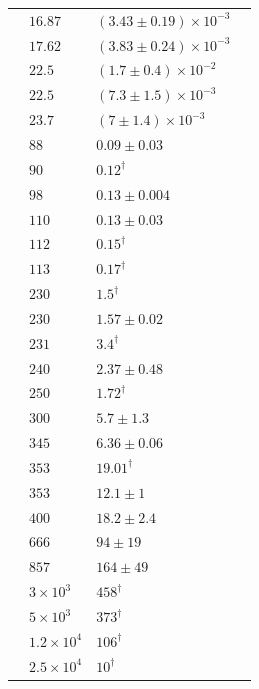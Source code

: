 \documentclass[9pt]{extarticle}   	%
\begin{document}
\begin{table}
\begin{center}
\begin{tabular}{llll}
 & $16.87$ & $(3.43\pm0.19)\times10^{-3}$ & \citet{2012MNRAS.423.1089A}\\
 & $17.62$ & $(3.83\pm0.24)\times10^{-3}$ & \citet{2012MNRAS.423.1089A}\\
 & $22.5$ & $(1.7\pm0.4)\times10^{-2}$ & \citet{1985ApJ...288..595T}\\
 & $22.5$ & $(7.3\pm1.5)\times10^{-3}$ & \citet{1990ApJ...355..635K}\\
 & $23.7$ & $(7\pm1.4)\times10^{-3}$ & \citet{1993ApJ...414..333G}\\
 & $88$ & $0.09\pm0.03$ & \citet{1990ApJ...355..635K}\\
 & $90$ & $0.12^{\dag}$ & \citet{1994AA...281..161A}\\
 & $98$ & $0.13\pm0.004$ & \citet{1991AJ....102.2054O}\\
 & $110$ & $0.13\pm0.03$ & \citet{1990ApJ...355..635K}\\
 & $112$ & $0.15^{\dag}$ & \citet{1989ApJ...345..257W}\\
 & $113$ & $0.17^{\dag}$ & \citet{1986BAAS...18..973K}\\
 & $230$ & $1.5^{\dag}$ & \citet{1991ApJ...379L..25C}\\
 & $230$ & $1.57\pm0.02$ & \citet{1993AA...273..221R}\\
 & $231$ & $3.4^{\dag}$ & \citet{2001AA...365..440M}\\
 & $240$ & $2.37\pm0.48$ & \citet{1990ApJ...355..635K}\\
 & $250$ & $1.72^{\dag}$ & \citet{1994AA...281..161A}\\
 & $300$ & $5.7\pm1.3$ & \citet{1990ApJ...355..635K}\\
 & $345$ & $6.36\pm0.06$ & \citet{1993AA...273..221R}\\
 & $353$ & $19.01^{\dag}$ & \citet{2008ApJS..175..277D}\\
 & $353$ & $12.1\pm1$ & \citet{2000ApJ...530..851C}\\
 & $400$ & $18.2\pm2.4$ & \citet{2000ApJ...530..851C}\\
 & $666$ & $94\pm19$ & \citet{2000ApJ...530..851C}\\
 & $857$ & $164\pm49$ & \citet{2000ApJ...530..851C}\\
 & $3\times10^{3}$ & $458^{\dag}$ & \citet{1993AA...273..221R}\\
 & $5\times10^{3}$ & $373^{\dag}$ & \citet{1993AA...273..221R}\\
 & $1.2\times10^{4}$ & $106^{\dag}$ & \citet{1993AA...273..221R}\\
 & $2.5\times10^{4}$ & $10^{\dag}$ & \citet{1993AA...273..221R}\\
\end{tabular}
\end{center}
\label{default}
\end{table}%
\end{document}
